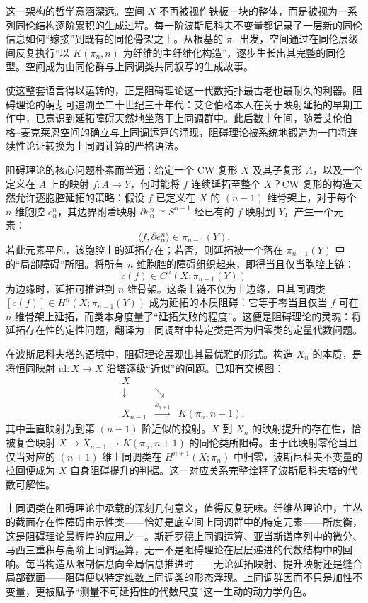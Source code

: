 \documentclass[12pt,a4paper]{article}
\begin{document}
这一架构的哲学意涵深远。空间 $X$ 不再被视作铁板一块的整体，而是被视为一系列同伦结构逐阶累积的生成过程。每一阶波斯尼科夫不变量都记录了一层新的同伦信息如何“嫁接”到既有的同伦骨架之上。从根基的 $\pi_1$ 出发，空间通过在同伦层级间反复执行“以 $K(\pi_n,n)$ 为纤维的主纤维化构造”，逐步生长出其完整的同伦型。空间成为由同伦群与上同调类共同叙写的生成故事。

使这整套语言得以运转的，正是阻碍理论这一代数拓扑最古老也最耐久的利器。阻碍理论的萌芽可追溯至二十世纪三十年代：艾仑伯格本人在关于映射延拓的早期工作中，已意识到延拓障碍天然地坐落于上同调群中。此后数十年间，随着艾伦伯格–麦克莱恩空间的确立与上同调运算的涌现，阻碍理论被系统地锻造为一门将连续性论证转换为上同调计算的严格语法。

阻碍理论的核心问题朴素而普遍：给定一个 CW 复形 $X$ 及其子复形 $A$，以及一个定义在 $A$ 上的映射 $f:A\to Y$，何时能将 $f$ 连续延拓至整个 $X$？CW 复形的构造天然允许逐胞腔延拓的策略：假设 $f$ 已定义在 $X$ 的 $(n-1)$ 维骨架上，对于每个 $n$ 维胞腔 $e^n_\alpha$，其边界附着映射 $\partial e^n_\alpha\cong S^{n-1}$ 经已有的 $f$ 映射到 $Y$，产生一个元素：
$$
\langle f,\partial e^n_\alpha\rangle\in\pi_{n-1}(Y).
$$
若此元素平凡，该胞腔上的延拓存在；若否，则延拓被一个落在 $\pi_{n-1}(Y)$ 中的“局部障碍”所阻。将所有 $n$ 维胞腔的障碍组织起来，即得当且仅当胞腔上链：
$$
c(f)\in C^n(X;\pi_{n-1}(Y))
$$
为边缘时，延拓可推进到 $n$ 维骨架。这条上链不仅为上边缘，且其同调类 $[c(f)]\in H^n(X;\pi_{n-1}(Y))$ 成为延拓的本质阻碍：它等于零当且仅当 $f$ 可在 $n$ 维骨架上延拓，而类本身度量了“延拓失败的程度”。这便是阻碍理论的灵魂：将延拓存在性的定性问题，翻译为上同调群中特定类是否为归零类的定量代数问题。

在波斯尼科夫塔的语境中，阻碍理论展现出其最优雅的形式。构造 $X_n$ 的本质，是将恒同映射 $\text{id}:X\to X$ 沿塔逐级“近似”的问题。已知有交换图：
$$
\begin{array}{ccc}
X & & \\
\downarrow & \searrow & \\
X_{n-1} & \stackrel{k_{n+1}}{\longrightarrow} & K(\pi_n,n+1),
\end{array}
$$
其中垂直映射为到第 $(n-1)$ 阶近似的投射。$X$ 到 $X_n$ 的映射提升的存在性，恰被复合映射 $X\to X_{n-1}\to K(\pi_n,n+1)$ 的同伦类所阻碍。由于此映射零伦当且仅当对应的 $(n+1)$ 维上同调类在 $H^{n+1}(X;\pi_n)$ 中归零，波斯尼科夫不变量的拉回便成为 $X$ 自身阻碍提升的判据。这一对应关系完整诠释了波斯尼科夫塔的代数可解性。

上同调类在阻碍理论中承载的深刻几何意义，值得反复玩味。纤维丛理论中，主丛的截面存在性障碍由示性类——恰好是底空间上同调群中的特定元素——所度衡，这是阻碍理论最辉煌的应用之一。斯廷罗德上同调运算、亚当斯谱序列中的微分、马西三重积与高阶上同调运算，无一不是阻碍理论在层层递进的代数结构中的回响。每当构造从限制信息向全局信息推进时——无论延拓映射、提升映射还是缝合局部截面——阻碍便以特定维数上同调类的形态浮现。上同调群因而不只是加性不变量，更被赋予“测量不可延拓性的代数尺度”这一生动的动力学角色。
\end{document}

